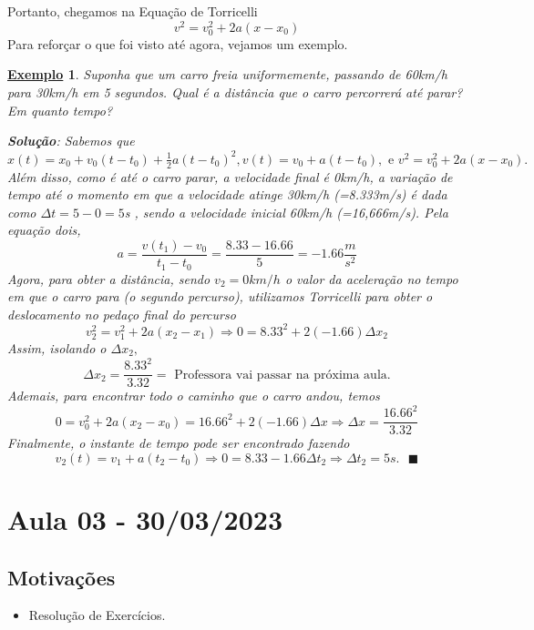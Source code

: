 \documentclass{article}
\newtheorem{example}{\underline{Exemplo}}
\renewcommand\qedsymbol{$\blacksquare$}
\begin{document}
 Portanto, chegamos na Equa\c c\~ao de Torricelli
  $$
  \boxed{v^{2} = v_{0}^{2} + 2a(x-x_{0})}
  $$
  Para refor\c car o que foi visto at\'e agora, vejamos um exemplo.
 \begin{example}
   Suponha que um carro freia uniformemente, passando de 60km/h para 30km/h em 5 segundos. Qual \'e a dist\^ancia
que o carro percorrer\'a at\'e parar? Em quanto tempo?

  \textbf{Solu\c c\~ao}: Sabemos que $x(t) = x_{0} + v_{0}(t-t_{0}) + \frac{1}{2}a(t-t_{0})^{2}, v(t) = v_{0} + a(t-t_{0}),
\text{ e }v^{2} = v_{0}^{2} + 2a(x-x_{0}).$ Al\'em disso, como \'e at\'e o carro parar, a velocidade final \'e 0km/h, a varia\c c\~ao
de tempo at\'e o momento em que a velocidade atinge 30km/h (=8.333m/s) \'e dada como $\Delta t = 5 - 0 = 5$s , sendo a velocidade inicial 60km/h (=16,666m/s). 
Pela equa\c c\~ao dois, 
  $$
    a = \frac{v(t_{1}) - v_{0}}{t_{1}-t_{0}} = \frac{8.33 - 16.66}{5} = -1.66\frac{m}{s^{2}}
  $$
  Agora, para obter a dist\^ancia, sendo $v_{2} = 0km/h$ o valor da acelera\c c\~ao no tempo em que o carro para (o segundo percurso),
utilizamos Torricelli para obter o deslocamento no peda\c co final do percurso
  $$
    v_{2}^{2} = v_{1}^{2} + 2a(x_{2}-x_{1}) \Rightarrow 0 = 8.33^{2} + 2(-1.66)\Delta x_{2}
  $$
  Assim, isolando o $\Delta x_{2},$  
    $$
    \Delta x_{2} = \frac{8.33^{2}}{3.32} = \text{ Professora vai passar na pr\'oxima aula.}
    $$
  Ademais, para encontrar todo o caminho que o carro andou, temos 
    $$
      0 = v_{0}^{2} + 2a(x_{2} - x_{0}) = 16.66^{2} + 2(-1.66)\Delta x \Rightarrow \Delta x = \frac{16.66^{2}}{3.32}
    $$
  Finalmente, o instante de tempo pode ser encontrado fazendo 
    $$
    v_{2}(t) = v_{1} + a(t_{2}-t_{0}) \Rightarrow 0 = 8.33 - 1.66\Delta t_{2} \Rightarrow \Delta t_{2} = 5s.\text{ \qedsymbol}
    $$
 \end{example}

\section{ Aula 03 - 30/03/2023}
\subsection{Motiva\c c\~oes}
 \begin{itemize}
   \item Resolu\c c\~ao de Exerc\'icios.
 \end{itemize}
\end{document}
